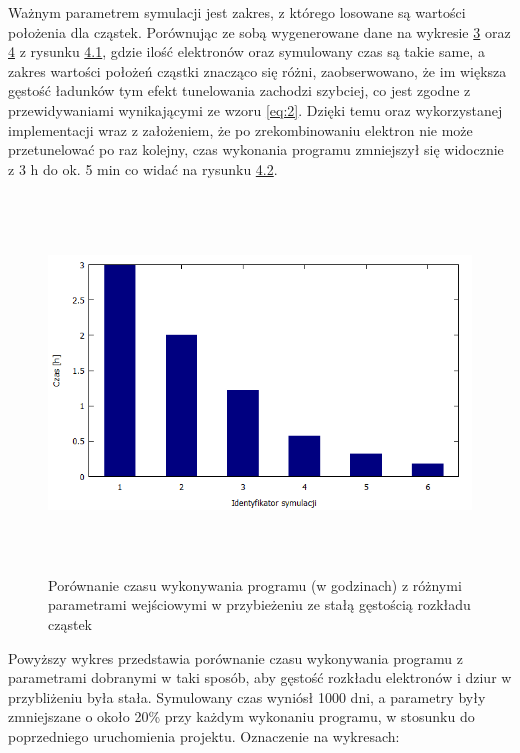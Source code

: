 Ważnym parametrem symulacji jest zakres, z którego losowane są wartości położenia dla cząstek. Porównując ze sobą wygenerowane dane na wykresie  \hyperref[wykres:1]{3} oraz \hyperref[wykres:2]{4} z rysunku \hyperref[rys:1]{4.1}, gdzie ilość elektronów oraz symulowany czas są takie same, a zakres wartości położeń cząstki znacząco się różni, zaobserwowano, że im większa gęstość ładunków tym efekt tunelowania zachodzi szybciej, co jest zgodne z przewidywaniami wynikającymi ze wzoru \ref{eq:2}. Dzięki temu oraz wykorzystanej implementacji wraz z założeniem, że po zrekombinowaniu elektron nie może przetunelować po raz kolejny, czas wykonania programu zmniejszył się widocznie z 3 h do ok. 5 min co widać na rysunku \hyperref[rys:2]{4.2}. 

\begin{figure}[H]
\centering
\includegraphics[width=17cm, height = 10cm]{czas_all}
\caption{Porównanie czasu wykonywania programu (w godzinach) z różnymi parametrami wejściowymi w przybieżeniu ze stałą gęstością rozkładu cząstek}
\label{rys:3}
\end{figure}

Powyższy wykres przedstawia porównanie czasu wykonywania programu z parametrami dobranymi w taki sposób, aby gęstość rozkładu elektronów i dziur  w przybliżeniu była stała. Symulowany czas wyniósł 1000 dni, a parametry były zmniejszane o około 20\% przy każdym wykonaniu programu, w stosunku do poprzedniego uruchomienia projektu. Oznaczenie na wykresach:

